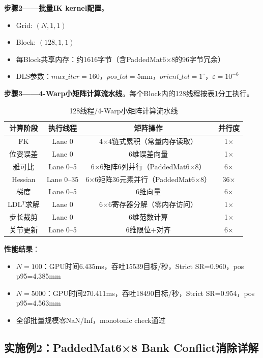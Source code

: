 \documentclass[a4paper,12pt]{ctexart}
\begin{document}
\textbf{步骤2——批量IK kernel配置}。
\begin{itemize}
    \item Grid: $(N,1,1)$
    \item Block: $(128,1,1)$
    \item 每Block共享内存：约1616字节（含PaddedMat6×8的96字节冗余）
    \item DLS参数：$max\_iter=160$，$pos\_tol=5$mm，$orient\_tol=1^\circ$，$\varepsilon=10^{-6}$
\end{itemize}

\textbf{步骤3——4-Warp小矩阵计算流水线}。每个Block内的128线程按表\ref{tab:warp}分工执行。

\begin{table}[H]
\centering
\caption{128线程/4-Warp小矩阵计算流水线}
\label{tab:warp}
\small
\begin{tabular}{cccc}
\toprule
\textbf{计算阶段} & \textbf{执行线程} & \textbf{矩阵操作} & \textbf{并行度}\\
\midrule
FK & Lane 0 & 4×4链式累积（常量内存读取） & 1×\\
位姿误差 & Lane 0 & 6维误差向量 & 1×\\
雅可比 & Lane 0--5 & 6×6矩阵6列并行（PaddedMat6×8） & 6×\\
Hessian & Lane 0--35 & 6×6矩阵36元素并行（PaddedMat6×8） & 36×\\
梯度 & Lane 0--5 & 6维向量 & 6×\\
LDL$^T$求解 & Lane 0 & 6×6寄存器分解（零内存访问） & 1×\\
步长裁剪 & Lane 0 & 6维范数计算 & 1×\\
关节更新 & Lane 0--5 & 6维限位+对齐 & 6×\\
\bottomrule
\end{tabular}
\end{table}

\textbf{性能结果}：
\begin{itemize}
    \item $N=100$：GPU时间6.435ms，吞吐15539目标/秒，Strict SR=0.960，pos p95=4.385mm
    \item $N=5000$：GPU时间270.411ms，吞吐18490目标/秒，Strict SR=0.954，pos p95=4.563mm
    \item 全部批量规模零NaN/Inf，monotonic check通过
\end{itemize}

\subsection{实施例2：PaddedMat6×8 Bank Conflict消除详解}
\end{document}
